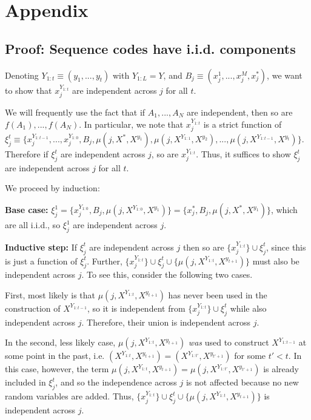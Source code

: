 \documentclass{article}
\begin{document}
\section{Appendix}

\subsection{Proof: Sequence codes have i.i.d. components}

Denoting $Y_{1:t} \equiv (y_1, ..., y_t)$ with $Y_{1:L} = Y$, and $B_j \equiv (x^1_j, ..., x^M_j, x^*_j)$, we want to show that $x_j^{Y_{1:t}}$ are independent across $j$ for all $t$.

We will frequently use the fact that if $A_1, ..., A_N$ are independent, then so are $f(A_1), ..., f(A_N)$. In particular, we note that $x_j^{Y_{1:t}}$ is a strict function of $\xi^t_j \equiv \{x_j^{Y_{1:t-1}}, ..., x_j^{Y_{1:0}}, B_j, \mu(j, X^*, X^{y_1}), \mu(j, X^{Y_{1:1}}, X^{y_2}), ..., \mu(j, X^{Y_{1:t-1}}, X^{y_t})\}.$ Therefore if $\xi^t_j$ are independent across $j$, so are $x_j^{Y_{1:t}}$. Thus, it suffices to show $\xi^t_j$ are independent across $j$ for all $t$.

We proceed by induction:

\textbf{Base case:} $\xi^1_j = \{x^{Y_{1:0}}_j, B_j, \mu(j, X^{Y_{1:0}}, X^{y_1})\} = \{x^*_j, B_j, \mu(j, X^*, X^{y_1})\}$, which are all i.i.d., so $\xi^1_j$ are independent across $j$.

\textbf{Inductive step:} If $\xi^t_j$ are independent across $j$ then so are $\{x_j^{Y_{1:t}}\} \cup \xi^t_j$, since this is just a function of $\xi^t_j$. Further, $\{x_j^{Y_{1:t}}\} \cup \xi^t_j \cup \{\mu(j, X^{Y_{1:t}}, X^{y_{t+1}})\}$ must also be independent across $j$. To see this, consider the following two cases.

First, most likely is that $\mu(j, X^{Y_{1:t}}, X^{y_{t+1}})$ has never been used in the construction of $X^{Y_{1:t-1}}$, so it is independent from $\{x_j^{Y_{1:t}}\} \cup \xi^t_j$ while also independent across $j$. Therefore, their union is independent across $j$.

In the second, less likely case, $\mu(j, X^{Y_{1:t}}, X^{y_{t+1}})$ \textit{was} used to construct $X^{Y_{1:t-1}}$ at some point in the past, i.e. $(X^{Y_{1:t}}, X^{y_{t+1}}) = (X^{Y_{1:t'}}, X^{y_{t'+1}})$ for some $t' < t$. In this case, however, the term $\mu(j, X^{Y_{1:t}}, X^{y_{t+1}}) = \mu(j, X^{Y_{1:t'}}, X^{y_{t'+1}})$ is already included in $\xi^t_j$, and so the independence across $j$ is not affected because no new random variables are added. Thus, $\{x_j^{Y_{1:t}}\} \cup \xi^t_j \cup \{\mu(j, X^{Y_{1:t}}, X^{y_{t+1}})\}$ is independent across $j$.
\end{document}
